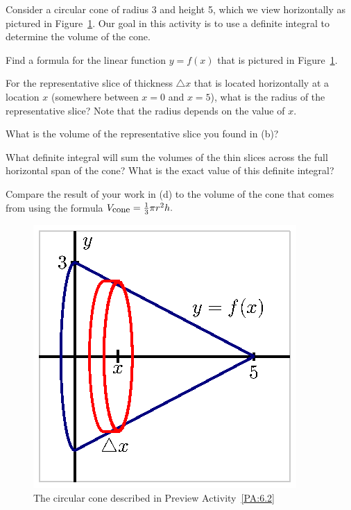 \begin{pa} \label{PA:6.2}  Consider a circular cone of radius 3 and height 5, which we view horizontally as pictured in Figure~\ref{F:PA.6.2}.  Our goal in this activity is to use a definite integral to determine the volume of the cone.

\ba
	\item Find a formula for the linear function $y = f(x)$ that is pictured in Figure~\ref{F:PA.6.2}.
	\item For the representative slice of thickness $\triangle x$ that is located horizontally at a location $x$ (somewhere between $x = 0$ and $x = 5$), what is the radius of the representative slice?  Note that the radius depends on the value of $x$.
	\item What is the volume of the representative slice you found in (b)?
	\item What definite integral will sum the volumes of the thin slices across the full horizontal span of the cone?  What is the exact value of this definite integral?
	\item Compare the result of your work in (d) to the volume of the cone that comes from using the formula $V_{\text{\small{cone}}} = \frac{1}{3} \pi r^2 h.$
\ea

\begin{figure}[h]
\begin{center}
\includegraphics{figures/6_2_PA1.eps}
\caption{The circular cone described in Preview Activity~\ref{PA:6.2}} \label{F:PA.6.2}
\end{center}
\end{figure}

\end{pa} 
\afterpa